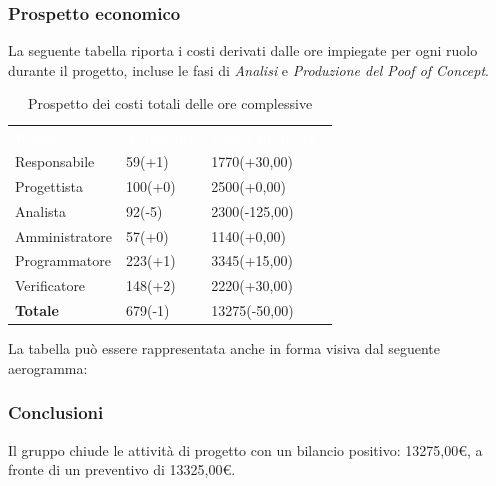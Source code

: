 \subsubsection{Prospetto economico}
La seguente tabella riporta i costi derivati dalle ore impiegate per ogni ruolo durante il progetto, incluse le fasi di \textit{Analisi} e \textit{Produzione del Poof of Concept}.

\begin{table}[H]
\begin{center}
\renewcommand{\arraystretch}{1.5}
\begin{tabular}{ m{}<{\centering}  m{}<{\centering} m{}<{\centering}}
	\rowcolor{darkblue}
	\textcolor{white}{\textbf{Ruolo}}&\textcolor{white}{\textbf{Totale ore}}&\textcolor{white}{\textbf{Costo totale (\euro)}}\\ 

	Responsabile & 59(+1) & 1770(+30,00) \\	
	
	Progettista & 100(+0) & 2500(+0,00) \\
	
	Analista & 92(-5) & 2300(-125,00) \\

	Amministratore & 57(+0) & 1140(+0,00) \\
	
	Programmatore & 223(+1) & 3345(+15,00) \\
	
	Verificatore & 148(+2) & 2220(+30,00) \\
	
	\textbf{Totale} & 679(-1) & 13275(-50,00) \\
	
\end{tabular}
\caption{Prospetto dei costi totali delle ore complessive}
\end{center}
\end{table}

La tabella può essere rappresentata anche in forma visiva dal seguente aerogramma:

\subsubsection{Conclusioni}
Il gruppo chiude le attività di progetto con un bilancio positivo: 13275,00\euro, a fronte di un preventivo di 13325,00\euro. \\

